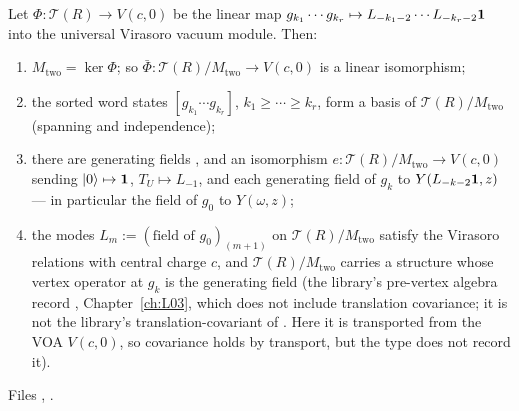 \begin{theorem}[$M_{\mathrm{two}} = \ker\Phi$; the presentation is the Virasoro VOA]\label{l11:thm:virpres}
Let $\Phi:\mathcal T(R)\to V(c,0)$ be the linear map $g_{k_1}\cdots g_{k_r}\mapsto L_{-k_1-2}\cdots L_{-k_r-2}\mathbf{1}$ into the
universal Virasoro vacuum module. Then:
\begin{enumerate}
\item $M_{\mathrm{two}} = \ker\Phi$; so $\bar\Phi:\mathcal T(R)/M_{\mathrm{two}}\to V(c,0)$ is a linear isomorphism;
\item the sorted word states $[g_{k_1}\cdots g_{k_r}]$, $k_1\ge\cdots\ge k_r$, form a basis of $\mathcal T(R)/M_{\mathrm{two}}$ (spanning and
  independence);
\item there are generating fields , and an isomorphism
  $e:\mathcal T(R)/M_{\mathrm{two}}\to V(c,0)$ sending $|0\rangle\mapsto\mathbf{1}$, $T_U\mapsto L_{-1}$, and each generating field of
  $g_k$ to $Y(L_{-k-2}\mathbf{1},z)$ --- in particular the field of $g_0$ to $Y(\omega,z)$;
\item the modes $L_m := (\text{field of }g_0)_{(m+1)}$ on $\mathcal T(R)/M_{\mathrm{two}}$ satisfy the Virasoro relations with central charge
  $c$, and $\mathcal T(R)/M_{\mathrm{two}}$ carries a  structure whose vertex operator at $g_k$ is the generating field
  (the library's pre-vertex algebra record , Chapter~\ref{ch:L03}, which does not include translation
  covariance; it is not the library's translation-covariant  of .
  Here it is transported from the VOA $V(c,0)$, so covariance holds by transport, but the type does not record it).
\end{enumerate}
\end{theorem}
\noindent Files ,
.
